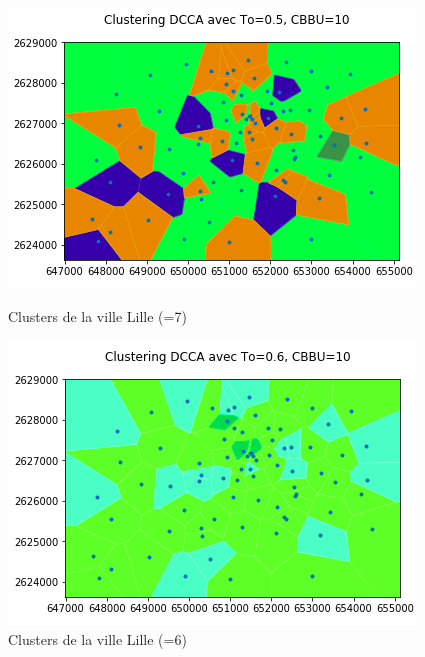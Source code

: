 \documentclass{report}
\begin{document}
\begin{figure}[H]
  \begin{minipage}{0.4\textwidth}
    \centering
    \includegraphics[scale=0.55]{images/To05.png}
    \caption{Clusters de la ville Lille (=7)}\label{Fig:Data1}
  \end{minipage}\hfill
  \begin{minipage}{0.4\textwidth}
    \centering
    \includegraphics[scale=0.55]{images/To06.png}
    \caption{Clusters de la ville Lille (=6)}\label{Fig:Data2}
  \end{minipage}
\end{figure} 
\end{document}
